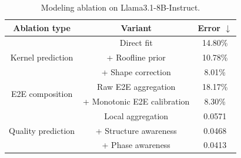 \begin{table}[t]
\centering
\small
\caption{Modeling ablation on Llama3.1-8B-Instruct.}
\begin{tabular}{ccc}
\toprule
Ablation type & Variant & Error $\downarrow$ \\
\midrule
\multirow{3}{*}{Kernel prediction} & Direct fit & 14.80\% \\
 & + Roofline prior & 10.78\% \\
 & + Shape correction & 8.01\% \\
\midrule
\multirow{2}{*}{E2E composition} & Raw E2E aggregation & 18.17\% \\
 & + Monotonic E2E calibration & 8.30\% \\
\midrule
\multirow{3}{*}{Quality prediction} & Local aggregation & 0.0571 \\
 & + Structure awareness & 0.0468 \\
 & + Phase awareness & 0.0413 \\
\bottomrule
\end{tabular}
\label{tab:modeling-ablation}
\end{table}
